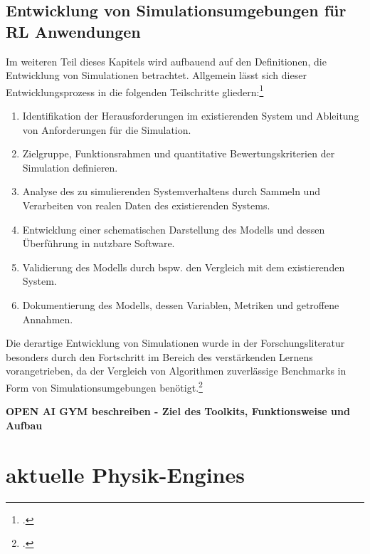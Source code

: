 \subsection{Entwicklung von Simulationsumgebungen für RL Anwendungen}
Im weiteren Teil dieses Kapitels wird aufbauend auf den Definitionen, die Entwicklung von Simulationen betrachtet.
Allgemein lässt sich dieser Entwicklungsprozess in die folgenden Teilschritte gliedern:\footcite[Vgl.][S. 8f.]{Maria.1997}
\begin{enumerate}
    \item Identifikation der Herausforderungen im existierenden System und Ableitung von Anforderungen für die Simulation.
    \item Zielgruppe, Funktionsrahmen und quantitative Bewertungskriterien der Simulation definieren.
    \item Analyse des zu simulierenden Systemverhaltens durch Sammeln und Verarbeiten von realen Daten des existierenden Systems.
    \item Entwicklung einer schematischen Darstellung des Modells und dessen Überführung in nutzbare Software.
    \item Validierung des Modells durch bspw. den Vergleich mit dem existierenden System.
    \item Dokumentierung des Modells, dessen Variablen, Metriken und getroffene Annahmen.
\end{enumerate}

Die derartige Entwicklung von Simulationen wurde in der Forschungsliteratur besonders durch den Fortschritt im Bereich des verstärkenden Lernens vorangetrieben, da der Vergleich von Algorithmen zuverlässige Benchmarks in Form von Simulationsumgebungen benötigt.\footcite[Vgl.][S. 1]{Brockman.2016}

\textbf{OPEN AI GYM beschreiben - Ziel des Toolkits, Funktionsweise und Aufbau}
\section{aktuelle Physik-Engines}